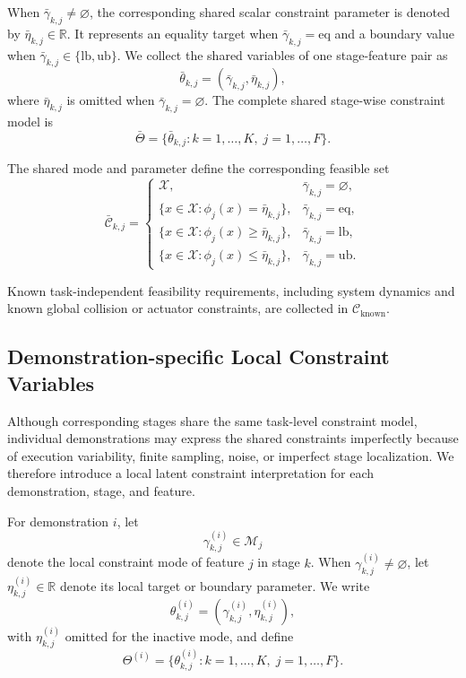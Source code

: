 \documentclass[lettersize,journal]{IEEEtran}
\begin{document}
When $\bar{\gamma}_{k,j}\neq\varnothing$, the corresponding shared scalar
constraint parameter is denoted by $\bar{\eta}_{k,j}\in\mathbb{R}$. It represents
an equality target when $\bar{\gamma}_{k,j}=\mathrm{eq}$ and a boundary value
when
$\bar{\gamma}_{k,j}\in\{\mathrm{lb},\mathrm{ub}\}$.
We collect the shared variables of one stage-feature pair as
\[
\bar{\theta}_{k,j}
=
\left(
\bar{\gamma}_{k,j},
\bar{\eta}_{k,j}
\right),
\]
where $\bar{\eta}_{k,j}$ is omitted when
$\bar{\gamma}_{k,j}=\varnothing$.
The complete shared stage-wise constraint model is
\[
\bar{\Theta}
=
\{
\bar{\theta}_{k,j}
:
k=1,\dots,K,\;
j=1,\dots,F
\}.
\]

The shared mode and parameter define the corresponding feasible set
\begin{equation}
\bar{\mathcal{C}}_{k,j}
=
\begin{cases}
\mathcal{X},
& \bar{\gamma}_{k,j}=\varnothing,
\\
\{x\in\mathcal{X}:\phi_j(x)=\bar{\eta}_{k,j}\},
& \bar{\gamma}_{k,j}=\mathrm{eq},
\\
\{x\in\mathcal{X}:\phi_j(x)\geq\bar{\eta}_{k,j}\},
& \bar{\gamma}_{k,j}=\mathrm{lb},
\\
\{x\in\mathcal{X}:\phi_j(x)\leq\bar{\eta}_{k,j}\},
& \bar{\gamma}_{k,j}=\mathrm{ub}.
\end{cases}
\label{eq:shared_stage_feature_feasible_set}
\end{equation}

Known task-independent feasibility requirements, including system dynamics and
known global collision or actuator constraints, are collected in
$\mathcal{C}_{\mathrm{known}}$.

\subsection{Demonstration-specific Local Constraint Variables}

Although corresponding stages share the same task-level constraint model,
individual demonstrations may express the shared constraints imperfectly because
of execution variability, finite sampling, noise, or imperfect stage
localization. We therefore introduce a local latent constraint interpretation for
each demonstration, stage, and feature.

For demonstration $i$, let
\[
\gamma_{k,j}^{(i)}
\in
\mathcal{M}_j
\]
denote the local constraint mode of feature $j$ in stage $k$. When
$\gamma_{k,j}^{(i)}\neq\varnothing$, let
$\eta_{k,j}^{(i)}\in\mathbb{R}$ denote its local target or boundary parameter.
We write
\[
\theta_{k,j}^{(i)}
=
\left(
\gamma_{k,j}^{(i)},
\eta_{k,j}^{(i)}
\right),
\]
with $\eta_{k,j}^{(i)}$ omitted for the inactive mode, and define
\[
\Theta^{(i)}
=
\{
\theta_{k,j}^{(i)}
:
k=1,\dots,K,\;
j=1,\dots,F
\}.
\]
\end{document}
